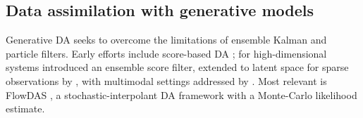 \subsection{Data assimilation with generative models}
Generative DA seeks to overcome the limitations of ensemble Kalman and particle filters. Early efforts include score-based DA \cite{rozet_score-based_2023}; for high-dimensional systems \cite{bao_ensemble_2024} introduced an ensemble score filter, extended to latent space for sparse observations by \cite{si_latent-ensf_2024}, with multimodal settings addressed by \cite{qu_deep_2024}. Most relevant is FlowDAS \cite{chen_flowdas_2025}, a stochastic-interpolant DA framework with a Monte-Carlo likelihood estimate.

